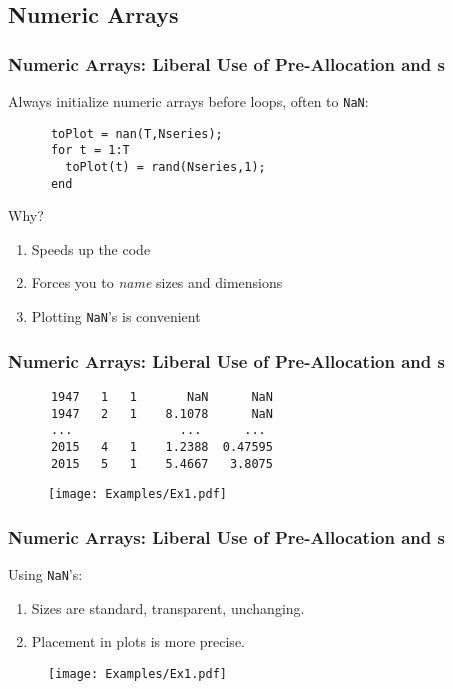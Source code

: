 \documentclass{beamer}
\begin{document}
\subsection{Numeric Arrays}
  \begin{frame}[fragile]
    \frametitle{Numeric Arrays: Liberal Use of Pre-Allocation and s}

    Always initialize numeric arrays before loops, often to
    \texttt{NaN}:
    \begin{lstlisting}
      toPlot = nan(T,Nseries);
      for t = 1:T
        toPlot(t) = rand(Nseries,1);
      end
    \end{lstlisting}
    Why?
    \begin{enumerate}
      \item Speeds up the code
      \item Forces you to \emph{name} sizes and dimensions
      \item Plotting \texttt{NaN}'s is convenient
    \end{enumerate}

	\end{frame}

  \begin{frame}[fragile]
    \frametitle{Numeric Arrays: Liberal Use of Pre-Allocation and s}

    \begin{lstlisting}
      1947   1   1       NaN      NaN
      1947   2   1    8.1078      NaN
      ...               ...      ...
      2015   4   1    1.2388  0.47595
      2015   5   1    5.4667   3.8075
    \end{lstlisting}
    \pause
    \begin{figure}
      \texttt{[image: Examples/Ex1.pdf]}
    \end{figure}
	\end{frame}

  \begin{frame}[fragile]
    \frametitle{Numeric Arrays: Liberal Use of Pre-Allocation and s}

    Using \texttt{NaN}'s:
    \begin{enumerate}
      \item Sizes are standard, transparent, unchanging.
      \item Placement in plots is more precise.
    \end{enumerate}
    \begin{figure}
      \texttt{[image: Examples/Ex1.pdf]}
    \end{figure}
	\end{frame}
\end{document}
